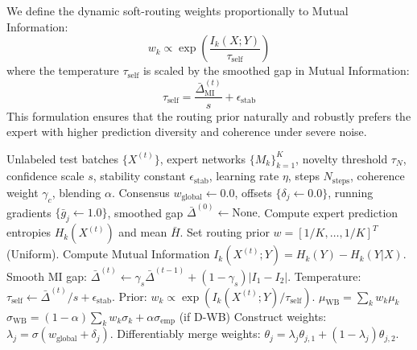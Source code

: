 \documentclass{article}
\theoremstyle{plain}
\theoremstyle{definition}
\theoremstyle{remark}
\begin{document}
We define the dynamic soft-routing weights proportionally to Mutual Information:
\begin{equation}
  w_k \propto \exp\left( \frac{I_k(X; Y)}{\tau_{\text{self}}} \right)
\end{equation}
where the temperature $\tau_{\text{self}}$ is scaled by the smoothed gap in Mutual Information:
\begin{equation}
  \tau_{\text{self}} = \frac{\bar{\Delta}_{\text{MI}}^{(t)}}{s} + \epsilon_{\text{stab}}
\end{equation}
This formulation ensures that the routing prior naturally and robustly prefers the expert with higher prediction diversity and coherence under severe noise.

\begin{algorithm}[tb]
  \caption{WB-CoMerge: Wasserstein-Barycenter Test-Time Model Merging}
  \label{alg:wbcomerge}
  \begin{scriptsize}
  \begin{algorithmic}[1]
     Unlabeled test batches $\{X^{(t)}\}$, expert networks $\{M_k\}_{k=1}^K$, novelty threshold $\tau_N$, confidence scale $s$, stability constant $\epsilon_{\text{stab}}$, learning rate $\eta$, steps $N_{\text{steps}}$, coherence weight $\gamma_c$, blending $\alpha$.
     Consensus $w_{\text{global}} \leftarrow 0.0$, offsets $\{\delta_j \leftarrow 0.0\}$, running gradients $\{\bar{g}_j \leftarrow 1.0\}$, smoothed gap $\bar{\Delta}^{(0)} \leftarrow \text{None}$.
    \STATE Compute expert prediction entropies $H_k(X^{(t)})$ and mean $\bar{H}$.
    \STATE Set routing prior $w = [1/K, \dots, 1/K]^T$ (Uniform).
    \ELSE
    \STATE Compute Mutual Information $I_k(X^{(t)}; Y) = H_k(Y) - H_k(Y|X)$.
    \STATE Smooth MI gap: $\bar{\Delta}^{(t)} \leftarrow \gamma_s \bar{\Delta}^{(t-1)} + (1-\gamma_s)|I_1 - I_2|$.
    \STATE Temperature: $\tau_{\text{self}} \leftarrow \bar{\Delta}^{(t)} / s + \epsilon_{\text{stab}}$.
    \STATE Prior: $w_k \propto \exp(I_k(X^{(t)}; Y) / \tau_{\text{self}})$.
    \ENDIF
    \STATE $\mu_{\text{WB}} = \sum_k w_k \mu_k$
    \STATE $\sigma_{\text{WB}} = (1-\alpha)\sum_k w_k \sigma_k + \alpha \sigma_{\text{emp}}$ (if D-WB)
    \STATE Construct weights: $\lambda_j = \sigma(w_{\text{global}} + \delta_j)$.
    \STATE Differentiably merge weights: $\theta_j = \lambda_j \theta_{j, 1} + (1 - \lambda_j)\theta_{j, 2}$.

\end{algorithmic}
\end{scriptsize}
\end{algorithm}
\end{document}
